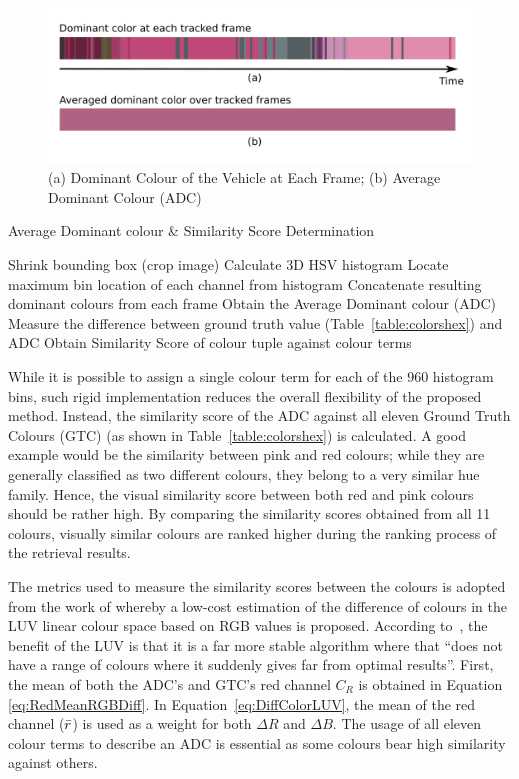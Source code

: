 \begin{figure}[hbt!]\centering
\includegraphics[width=.9\textwidth]{image/general/ADC.png}
\caption{(a) Dominant Colour of the Vehicle at Each Frame; (b) Average Dominant Colour (ADC)}
\label{fig:ADC}
\end{figure}

\begin{algorithm}[!h]
  \caption{Average Dominant colour \& Similarity Score Determination}
  \label{algo:ADC}
  \begin{algorithmic}[1]
        \STATE Shrink bounding box (crop image)
        \STATE Calculate 3D HSV histogram
        \STATE Locate maximum bin location of each channel from histogram
        \STATE Concatenate resulting dominant colours from each frame
    \ENDFOR
    \STATE Obtain the Average Dominant colour (ADC)
    \STATE Measure the difference between ground truth value (Table~\ref{table:colorshex}) and ADC
    \STATE Obtain Similarity Score of colour tuple against colour terms
    
  \end{algorithmic}
\end{algorithm}

While it is possible to assign a single colour term for each of the 960 histogram bins, such rigid implementation reduces the overall flexibility of the proposed method.
Instead, the similarity score of the ADC against all eleven Ground Truth Colours (GTC) (as shown in Table~\ref{table:colorshex}) is calculated. 
A good example would be the similarity between pink and red colours; while they are generally classified as two different colours, they belong to a very similar hue family. Hence, the visual similarity score between both red and pink colours should be rather high. By comparing the similarity scores obtained from all 11 colours, visually similar colours are ranked higher during the ranking process of the retrieval results.


The metrics used to measure the similarity scores between the colours is adopted from the work of  whereby a low-cost estimation of the difference of colours in the LUV linear colour space based on RGB values is proposed. 
According to~, the benefit of the LUV is that it is a far more stable algorithm where that ``does not have a range of colours where it suddenly gives far from optimal results''. 
First, the mean of both the ADC's and GTC's red channel $C_R$ is obtained in Equation \ref{eq:RedMeanRGBDiff}.
In Equation~\ref{eq:DiffColorLUV}, the mean of the red channel ($\bar{r}$) is used as a weight for both $\Delta{R}$ and $\Delta{B}$. 
The usage of all eleven colour terms to describe an ADC is essential as some colours bear high similarity against others.


